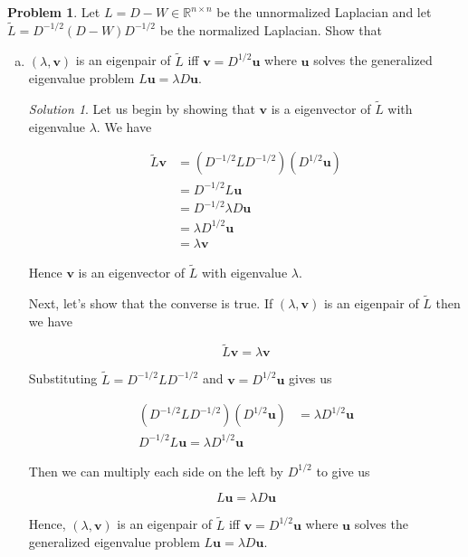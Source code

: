 \documentclass[12pt,a4paper]{article}
\theoremstyle{definition}
\newtheorem{problem}{Problem}
\theoremstyle{remark}
\newtheorem*{solution}{Solution}
\begin{document}
\begin{problem}
    Let $L= D-W \in \mathbb R^{n \times n}$ be the unnormalized Laplacian and let $\tilde L = D^{-1/2}(D-W) D^{-1/2}$ be the normalized Laplacian. Show that 

    \begin{enumerate}[(a)]
        \item $(\lambda, \mathbf v)$ is an eigenpair of $\tilde L$ iff $\mathbf v = D^{1/2} \mathbf u$ where $\mathbf u$ solves the generalized eigenvalue problem $L \mathbf u = \lambda D \mathbf u$. 
        \begin{solution}
            Let us begin by showing that $\mathbf v$ is a eigenvector of $\tilde L$ with eigenvalue $\lambda$. We have

            \begin{align*}
                \tilde L \mathbf v &= \left(D^{-1/2} L D^{-1/2}\right) \left(D^{1/2} \mathbf u\right) \\
                &= D^{-1/2} L \mathbf u \\
                &= D^{-1/2} \lambda D \mathbf u \\
                &= \lambda D^{1/2} \mathbf u \\
                &= \lambda \mathbf v
            \end{align*}

            Hence $\mathbf v$ is an eigenvector of $\tilde L$ with eigenvalue $\lambda$. 

            Next, let's show that the converse is true. If $(\lambda, \mathbf v)$ is an eigenpair of $\tilde L$ then we have

            $$\tilde L \mathbf v = \lambda \mathbf v$$

            Substituting $\tilde L = D^{-1/2}L D^{-1/2}$ and $\mathbf v = D^{1/2} \mathbf u$ gives us

            \begin{align*}\left( D^{-1/2} L D^{-1/2} \right) \left( D^{1/2} \mathbf u \right) &= \lambda D^{1/2} \mathbf u \\
                D^{-1/2} L \mathbf u = \lambda D^{1/2} \mathbf u
            \end{align*}

            Then we can multiply each side on the left by $D^{1/2}$ to give us 

            $$L \mathbf u = \lambda D \mathbf u$$

            Hence, $(\lambda, \mathbf v)$ is an eigenpair of $\tilde L$ iff $\mathbf v = D^{1/2} \mathbf u$ where $\mathbf u$ solves the generalized eigenvalue problem $L \mathbf u = \lambda D \mathbf u$. 
        \end{solution}


\end{enumerate}
\end{problem}
\end{document}
